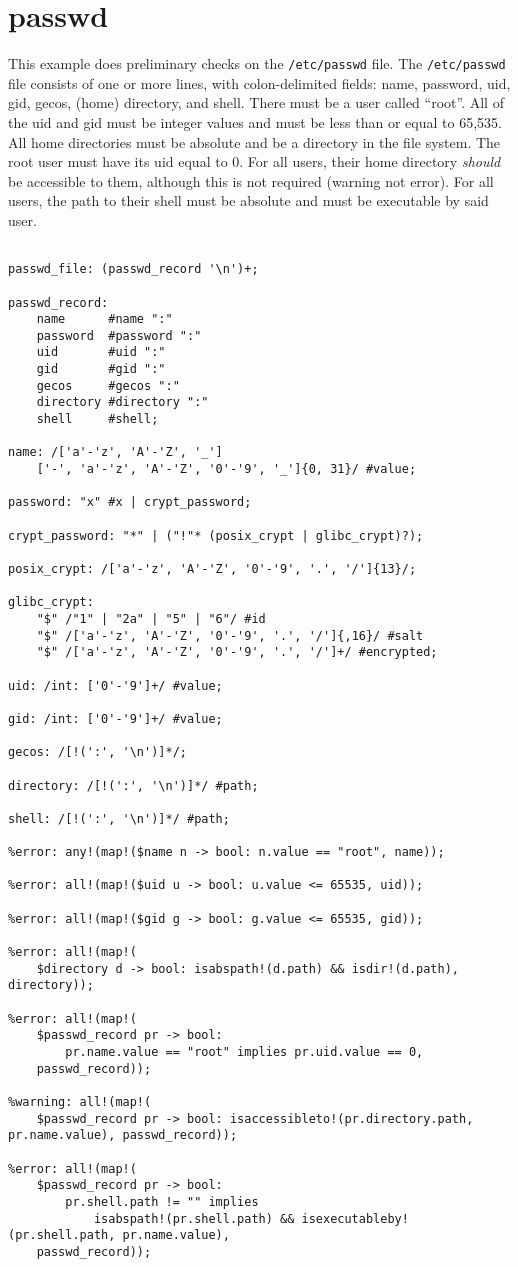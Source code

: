 
\section{passwd}
{
This example does preliminary checks on the \texttt{/etc/passwd} file.
The \texttt{/etc/passwd} file consists of one or more lines,
with colon-delimited fields: name, password, uid, gid, gecos, (home) directory,
and shell. There must be a user called ``root''.
All of the uid and gid must be integer values
and must be less than or equal to 65,535.
All home directories must be absolute and be a directory in the file system.
The root user must have its uid equal to 0.
For all users, their home directory \textit{should} be accessible to them, although
this is not required (warning not error).
For all users, the path to their shell must be absolute and must be executable
by said user.

\begin{lstlisting}[texcl=true, language=MAIA]
%parse: "/etc/passwd" as passwd_file;

passwd_file: (passwd_record '\n')+;

passwd_record:
	name      #name ":"
	password  #password ":"
	uid       #uid ":"
	gid       #gid ":"
	gecos     #gecos ":"
	directory #directory ":"
	shell     #shell;

name: /['a'-'z', 'A'-'Z', '_']
	['-', 'a'-'z', 'A'-'Z', '0'-'9', '_']{0, 31}/ #value;

password: "x" #x | crypt_password;

crypt_password: "*" | ("!"* (posix_crypt | glibc_crypt)?);

posix_crypt: /['a'-'z', 'A'-'Z', '0'-'9', '.', '/']{13}/;

glibc_crypt:
	"$" /"1" | "2a" | "5" | "6"/ #id
	"$" /['a'-'z', 'A'-'Z', '0'-'9', '.', '/']{,16}/ #salt
	"$" /['a'-'z', 'A'-'Z', '0'-'9', '.', '/']+/ #encrypted;

uid: /int: ['0'-'9']+/ #value;

gid: /int: ['0'-'9']+/ #value;

gecos: /[!(':', '\n')]*/;

directory: /[!(':', '\n')]*/ #path;

shell: /[!(':', '\n')]*/ #path;

%error: any!(map!($name n -> bool: n.value == "root", name));

%error: all!(map!($uid u -> bool: u.value <= 65535, uid));

%error: all!(map!($gid g -> bool: g.value <= 65535, gid));

%error: all!(map!(
	$directory d -> bool: isabspath!(d.path) && isdir!(d.path), directory));

%error: all!(map!(
	$passwd_record pr -> bool:
		pr.name.value == "root" implies pr.uid.value == 0,
	passwd_record));

%warning: all!(map!(
	$passwd_record pr -> bool: isaccessibleto!(pr.directory.path, pr.name.value), passwd_record));

%error: all!(map!(
	$passwd_record pr -> bool:
		pr.shell.path != "" implies
			isabspath!(pr.shell.path) && isexecutableby!(pr.shell.path, pr.name.value),
	passwd_record));

\end{lstlisting}
}

